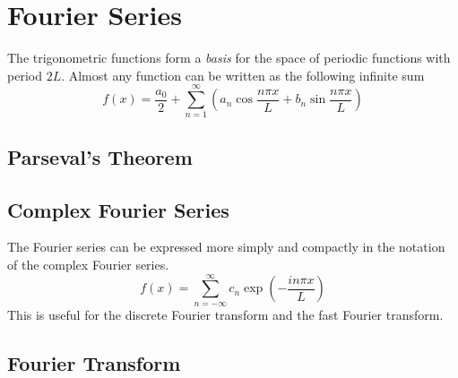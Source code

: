 \section{Fourier Series}
The trigonometric functions form a \textit{basis} for the space of periodic functions with period $2L$. Almost
any function can be written as the following infinite sum
\begin{equation*}
    f(x) = \frac{a_0}{2} + \sum_{n=1}^{\infty}\left(a_n \cos\frac{n\pi x}{L} + b_n \sin \frac{n \pi x}{L}\right)
\end{equation*}
\subsection*{Parseval's Theorem}
\subsection*{Complex Fourier Series}
The Fourier series can be expressed more simply and compactly in the notation of the complex Fourier series.
\begin{equation*}
    f(x) = \sum_{n = -\infty}^{\infty}c_n \exp\left(-\frac{in\pi x}{L}\right)
\end{equation*}
This is useful for the discrete Fourier transform and the fast Fourier transform.
\subsection*{Fourier Transform}